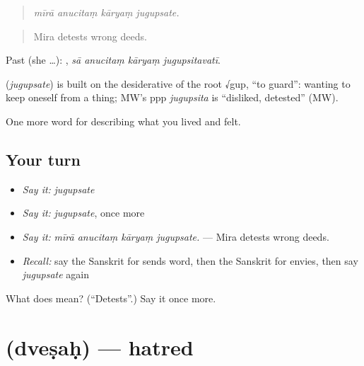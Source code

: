 \begin{quote}
   
\end{quote}

\begin{quote}
\emph{mīrā anucitaṃ kāryaṃ jugupsate.}
\end{quote}

\begin{quote}
Mira detests wrong deeds.
\end{quote}

Past (she …):    , \emph{sā anucitaṃ kāryaṃ jugupsitavatī}.

\begin{cousinweb}
\textbf{} (\emph{jugupsate}) is built on the desiderative of the root √gup, \textquotedblleft{}to guard\textquotedblright{}: wanting to keep oneself from a thing; MW's ppp \emph{jugupsita} is \textquotedblleft{}disliked, detested\textquotedblright{} (MW).
\end{cousinweb}

\begin{grammarlens}[title={What you've built}]
One more word for describing what you lived and felt.
\end{grammarlens}

\subsection*{Your turn}
\begin{itemize}
\raggedright
  \item \emph{Say it:} \emph{jugupsate}
  \item \emph{Say it:} \emph{jugupsate}, once more
  \item \emph{Say it:} \emph{mīrā anucitaṃ kāryaṃ jugupsate.} — Mira detests wrong deeds.
  \item \emph{Recall:} say the Sanskrit for sends word, then the Sanskrit for envies, then say \emph{jugupsate} again
\end{itemize}

\begin{tcolorbox}[breakable,colback=teal!4,colframe=teal!35!black,title={Before you move on}]
What does  mean? (\textquotedblleft{}Detests\textquotedblright{}.) Say it once more.
\end{tcolorbox}
\section[\texorpdfstring{\sk{द्वेषः} (dveṣaḥ)}{द्वेषः (dveṣaḥ)}]{ (dveṣaḥ) — hatred}

